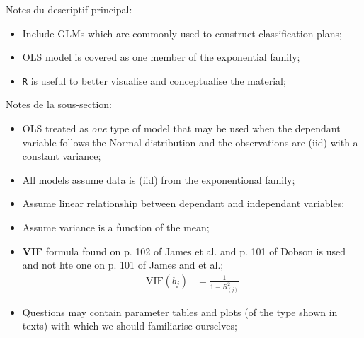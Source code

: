 \documentclass[12pt, titlepage, french]{report}
\begin{document}
\begin{distributions}[Description]
Notes du descriptif principal:
\begin{itemize}
	\item	Include GLMs which are commonly used to construct classification plans;
	\item	OLS model is covered as one member of the exponential family;
	\item	\texttt{R} is useful to better visualise and conceptualise the material;
\end{itemize}
\tcbline
Notes de la sous-section:
\begin{itemize}
	\item	OLS treated as \textit{one} type of model that may be used when the dependant variable follows the Normal distribution and the observations are (iid) with a constant variance;
	\item	All models assume data is (iid) from the exponentional family;
	\item	Assume linear relationship between dependant and independant variables;
	\item	Assume variance is a function of the mean;
	\item	\textbf{VIF} formula found on p. 102 of James et al. and p. 101 of Dobson is used and not hte one on p. 101 of James and et al.;
		\begin{align*}
			\text{VIF}(b_{j})
			&=	\frac{1}{1 - R_{(j)}^{2}}
		\end{align*}
	\item	Questions may contain parameter tables and plots (of the type shown in texts) with which we should familiarise ourselves;
\end{itemize}
\end{distributions}
\end{document}
